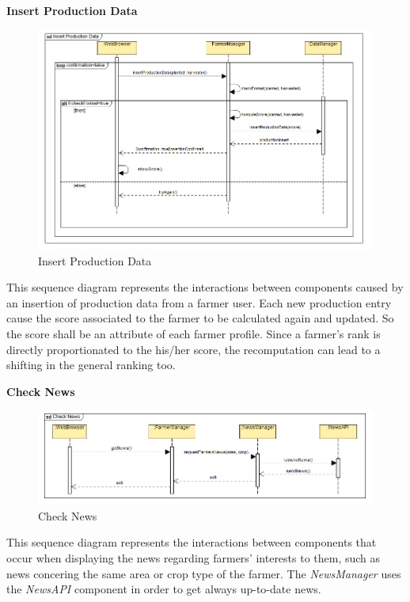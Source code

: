 \documentclass[table, 12pt]{article}
\begin{document}
\newpage
\textbf{Insert Production Data}
\begin{center}
    \begin{figure}[H]
        \includegraphics[scale=0.75, center]{assets/SequenceDiagram/InsertProductionData.png}
        \caption{Insert Production Data}
        \label{fig: production}
    \end{figure}
\end{center}
This sequence diagram represents the interactions between components caused by an insertion of production data from a farmer user.
Each new production entry cause the score associated to the farmer to be calculated again and updated. So the score shall be an attribute of each farmer profile. Since a farmer's rank is directly proportionated to the his/her score, the recomputation can lead to a shifting in the general ranking too.

\newpage
\textbf{Check News}
\begin{center}
    \begin{figure}[H]
        \includegraphics[scale=0.6, center]{assets/SequenceDiagram/CheckNews.png}
        \caption{Check News}
        \label{fig: news}
    \end{figure}
\end{center}
This sequence diagram represents the interactions between components that occur when displaying the news regarding farmers' interests to them, such as news concering the same area or crop type of the farmer.
The \textit{NewsManager} uses the \textit{NewsAPI} component in order to get always up-to-date news.
\end{document}
